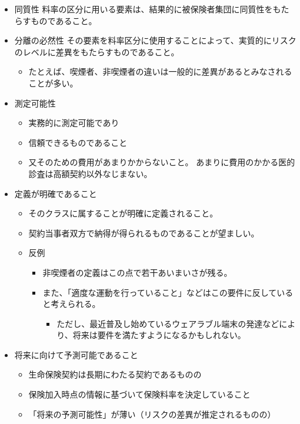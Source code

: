 \documentclass[
]{article}
\providecommand{\tightlist}{%
  \setlength{\itemsep}{0pt}\setlength{\parskip}{0pt}}
\begin{document}
\begin{itemize}
\tightlist
\item
  同質性
  料率の区分に用いる要素は、結果的に被保険者集団に同質性をもたらすものであること。
\item
  分離の必然性
  その要素を料率区分に使用することによって、実質的にリスクのレベルに差異をもたらすものであること。

  \begin{itemize}
  \tightlist
  \item
    たとえば、喫煙者、非喫煙者の違いは一般的に差異があるとみなされることが多い。
  \end{itemize}
\item
  測定可能性

  \begin{itemize}
  \tightlist
  \item
    実務的に測定可能であり
  \item
    信頼できるものであること
  \item
    又そのための費用があまりかからないこと。
    あまりに費用のかかる医的診査は高額契約以外なじまない。
  \end{itemize}
\item
  定義が明確であること

  \begin{itemize}
  \tightlist
  \item
    そのクラスに属することが明確に定義されること。
  \item
    契約当事者双方で納得が得られるものであることが望ましい。
  \item
    反例

    \begin{itemize}
    \tightlist
    \item
      非喫煙者の定義はこの点で若干あいまいさが残る。
    \item
      また、「適度な運動を行っていること」などはこの要件に反していると考えられる。

      \begin{itemize}
      \tightlist
      \item
        ただし、最近普及し始めているウェアラブル端末の発達などにより、将来は要件を満たすようになるかもしれない。
      \end{itemize}
    \end{itemize}
  \end{itemize}
\item
  将来に向けて予測可能であること

  \begin{itemize}
  \tightlist
  \item
    生命保険契約は長期にわたる契約であるものの
  \item
    保険加入時点の情報に基づいて保険料率を決定していること
  \item
    「将来の予測可能性」が薄い（リスクの差異が推定されるものの）


\end{itemize}
\end{itemize}
\end{document}
